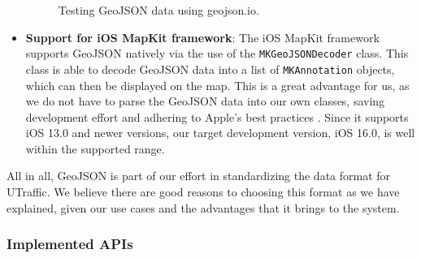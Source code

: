 \begin{itemize}
\begin{figure}[H]
        \caption{Testing GeoJSON data using geojson.io.}
        \label{fig:geojson_io}
    \end{figure}
    \item \textbf{Support for iOS MapKit framework}: The iOS MapKit framework supports GeoJSON natively via the use of the \lstinline{MKGeoJSONDecoder} class. This class is able to decode GeoJSON data into a list of \lstinline{MKAnnotation} objects, which can then be displayed on the map. This is a great advantage for us, as we do not have to parse the GeoJSON data into our own classes, saving development effort and adhering to Apple's best practices \cite{mkgeojsonobject}. Since it supports iOS 13.0 and newer versions, our target development version, iOS 16.0, is well within the supported range.
\end{itemize}

All in all, GeoJSON is part of our effort in standardizing the data format for UTraffic. We believe there are good reasons to choosing this format as we have explained, given our use cases and the advantages that it brings to the system.

\subsubsection{Implemented APIs}

